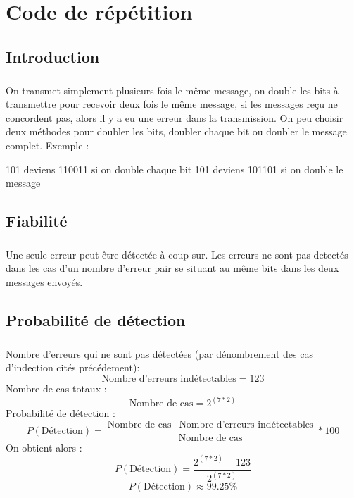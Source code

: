 
\chapter{Code de répétition}

    \section{Introduction}

        \paragraph{}
On transmet simplement plusieurs fois le même message, on double les bits à transmettre pour recevoir deux fois le même message, si les messages reçu ne concordent pas, alors il y a eu une erreur dans la transmission. On peu choisir deux méthodes pour doubler les bits, doubler chaque bit ou doubler le message complet. Exemple :

    101 deviens 110011 si on double chaque bit
    101 deviens 101101 si on double le message



    \section{Fiabilité}

        \paragraph{}
Une seule erreur peut être détectée à coup sur. Les erreurs ne sont pas detectés dans les cas d'un nombre d'erreur pair se situant au même bits dans les deux messages envoyés.


    \section{Probabilité de détection}

        \paragraph{}
Nombre d'erreurs qui ne sont pas détectées (par dénombrement des cas d'indection cités précédement):
\[  \text{Nombre d'erreurs indétectables} = 123 \]
Nombre de cas totaux :
\[  \text{Nombre de cas} = 2^{(7*2)} \]
Probabilité de détection :
\[  P(\text{Détection}) = \frac{\text{Nombre de cas} - \text{Nombre d'erreurs indétectables}}{\text{Nombre de cas}}*100 \]
On obtient alors :
\[  P(\text{Détection}) = \frac{2^{(7*2)} - 123}{2^{(7*2)}} \]
\[  P(\text{Détection}) \approx 99.25\% \]


